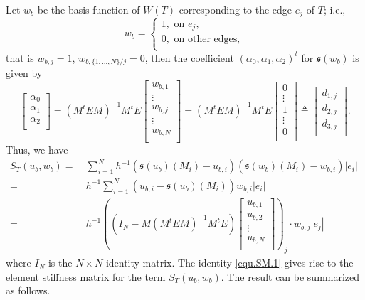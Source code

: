 \documentclass[final,leqno]{siamltex704}
\def\S{{\mathfrak s}}
\begin{document}
Let $w_{b}$ be the basis function of $W(T)$ corresponding to the edge $e_j$ of $T$; i.e.,
\begin{equation*}
w_{b}=\left\{
\begin{array}{lllll}
1, \text{ on } e_j,\\
0, \text{ on other edges},\\
\end{array}
\right.
\end{equation*}
that is $w_{b,j}=1$, $w_{b,\{1,\ldots, N\}/j}=0$,
then the coefficient $(\alpha_0,\alpha_1,\alpha_2)^t$ for $\S(w_b)$ is given by
\begin{equation*}
\begin{bmatrix}
\alpha_0  \\
\alpha_1  \\
\alpha_2  \\
\end{bmatrix}
=(M^tEM)^{-1}M^tE
\begin{bmatrix}
w_{b,1}\\
\vdots \\
w_{b,j}\\
\vdots \\
w_{b,N}\\
\end{bmatrix}
=(M^tEM)^{-1}M^tE
\begin{bmatrix}
0\\
\vdots \\
1\\
\vdots \\
0\\
\end{bmatrix}
\triangleq
\begin{bmatrix}
d_{1,j}\\
d_{2,j}\\
d_{3,j}\\
\end{bmatrix}.
\end{equation*}
Thus, we have
\begin{equation}\label{equ.SM.1}
\begin{split}
S_T(u_b,w_b)=&\ \sum_{i=1}^N h^{-1}(\S(u_b)(M_i)-u_{b,i})(\S(w_b)(M_i)-w_{b,i})|e_i|~\\
            =&\ h^{-1}\sum_{i=1}^N (u_{b,i}-\S(u_b)(M_i))w_{b,i}|e_i|\\
            =&\ h^{-1}\left((I_N-M(M^tEM)^{-1}M^tE)
\begin{bmatrix}
u_{b,1} \\
u_{b,2} \\
\vdots  \\
u_{b,N} \\
\end{bmatrix}\right)_j
\cdot w_{b,j}|e_j|
\end{split}
\end{equation}
where $I_N$ is the $N\times N$ identity matrix. The identity \eqref{equ.SM.1} gives rise to the element stiffness matrix for the term $S_T(u_b,w_b)$. The result can be summarized as follows.
\end{document}

